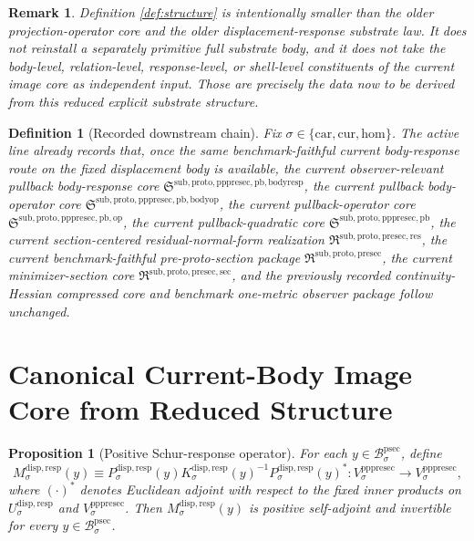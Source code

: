 \documentclass[11pt]{article}
\newcommand{\Car}{\mathrm{car}}
\newcommand{\Cur}{\mathrm{cur}}
\newcommand{\Hom}{\mathrm{hom}}
\newcommand{\ProtoSectionBody}[1]{\mathcal B_{#1}^{\mathrm{psec}}}
\newcommand{\PrePreProtoSectionPullbackCore}{\mathfrak S^{\mathrm{sub,proto,pppresec,pb}}}
\newcommand{\PrePreProtoSectionVertical}[1]{V_{#1}^{\mathrm{pppresec}}}
\newcommand{\PullbackOperatorCore}{\mathfrak S^{\mathrm{sub,proto,pppresec,pb,op}}}
\newcommand{\PullbackBodyOperatorCore}{\mathfrak S^{\mathrm{sub,proto,pppresec,pb,bodyop}}}
\newcommand{\PullbackBodyResponseCore}{\mathfrak S^{\mathrm{sub,proto,pppresec,pb,bodyresp}}}
\newcommand{\PreProtoSectionResidualPackage}{\mathfrak R^{\mathrm{sub,proto,presec,res}}}
\newcommand{\PreProtoSectionPackage}{\mathfrak R^{\mathrm{sub,proto,presec}}}
\newcommand{\PreProtoSectionMinSectionCore}{\mathfrak R^{\mathrm{sub,proto,presec,sec}}}
\newcommand{\SubstrateCarrier}[1]{U_{#1}^{\mathrm{disp,resp}}}
\newcommand{\SubstrateProjection}[1]{P_{#1}^{\mathrm{disp,resp}}}
\newcommand{\SubstrateOperator}[1]{K_{#1}^{\mathrm{disp,resp}}}
\newcommand{\SchurResponse}[1]{M_{#1}^{\mathrm{disp,resp}}}
\newtheorem{definition}{Definition}
\newtheorem{proposition}{Proposition}
\newtheorem{remark}{Remark}
\begin{document}
\begin{remark}
Definition \ref{def:structure} is intentionally smaller than the older projection-operator core and the older displacement-response substrate law. It does not reinstall a separately primitive full substrate body, and it does not take the body-level, relation-level, response-level, or shell-level constituents of the current image core as independent input. Those are precisely the data now to be derived from this reduced explicit substrate structure.
\end{remark}

\begin{definition}[Recorded downstream chain]
\label{def:downstream}
Fix \(\sigma\in\{\Car,\Cur,\Hom\}\). The active line already records that, once the same benchmark-faithful current body-response route on the fixed displacement body is available, the current observer-relevant pullback body-response core \(\PullbackBodyResponseCore\), the current pullback body-operator core \(\PullbackBodyOperatorCore\), the current pullback-operator core \(\PullbackOperatorCore\), the current pullback-quadratic core \(\PrePreProtoSectionPullbackCore\), the current section-centered residual-normal-form realization \(\PreProtoSectionResidualPackage\), the current benchmark-faithful pre-proto-section package \(\PreProtoSectionPackage\), the current minimizer-section core \(\PreProtoSectionMinSectionCore\), and the previously recorded continuity-Hessian compressed core and benchmark one-metric observer package follow unchanged.
\end{definition}

\section{Canonical Current-Body Image Core from Reduced Structure}

\begin{proposition}[Positive Schur-response operator]
\label{prop:schur}
For each \(y\in\ProtoSectionBody{\sigma}\), define
\[
\SchurResponse{\sigma}(y)
\equiv
\SubstrateProjection{\sigma}(y)
\SubstrateOperator{\sigma}(y)^{-1}
\SubstrateProjection{\sigma}(y)^*:
\PrePreProtoSectionVertical{\sigma}\to\PrePreProtoSectionVertical{\sigma},
\]
where \((\cdot)^*\) denotes Euclidean adjoint with respect to the fixed inner products on \(\SubstrateCarrier{\sigma}\) and \(\PrePreProtoSectionVertical{\sigma}\). Then \(\SchurResponse{\sigma}(y)\) is positive self-adjoint and invertible for every \(y\in\ProtoSectionBody{\sigma}\).
\end{proposition}
\end{document}
